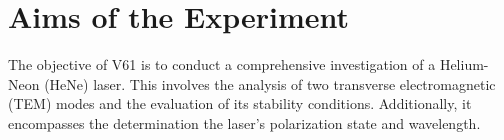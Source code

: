\section{Aims of the Experiment}

The objective of V61 is to conduct a comprehensive investigation 
of a Helium-Neon (HeNe) laser. This involves the analysis of two 
transverse electromagnetic (TEM) modes and the evaluation of its 
stability conditions. Additionally, it encompasses the determination
the laser's polarization state and wavelength.